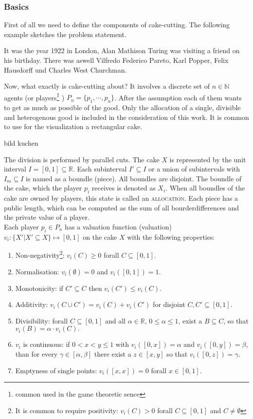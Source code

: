 \subsubsection{Basics}
First of all we need to define the components of cake-cutting. The following example sketches the problem statement.\\
\begin{bsp}
It was the year 1922 in London, Alan Mathison Turing was visiting a friend on his birthday. There was aswell Vilfredo Federico Pareto, Karl Popper, Felix Hausdorff und Charles West Churchman.
\end{bsp}
Now, what exactly is cake-cutting about? It involves a discrete set of $n \in \mathbb{N}$ agents (or players\footnote{common used in the game theoretic sence} ) $P_n=\{p_1,\cdots,p_n\}$. After the assumption each of them wants to get as much as possible of the good. Only the allocation of a single, divisible and heterogenous good is included in the consideration of this work. It is common to use for the visualization a rectangular cake.
\begin{center}
bild kuchen
\end{center}
The division is performed by parallel cuts. The cake $X$ is represented by the unit interval $I=[0,1] \subseteq \mathbb{R}$. Each subinterval $I'\subseteq I$ or a union of subintervals %
with $I_m\subseteq I$ is named as a boundle (piece). All boundles are disjoint. The boundle of the cake, which the player $p_i$ receives is denoted as $X_i$. When all boundles of the cake are owned by players, this state is called an \textsc{allocation}. Each piece has a public length, which can be computed as the sum of all bourderdifferences and the private value of a player.\\

Each player $p_i\in P_n$ has a valuation function (valuation) $v_i:\{X'|X' \subseteq X\} \mapsto [0,1]$ on the cake $X$ with the following properties:\\
\begin{enumerate}
\item Non-negativity\footnote{It is common to require positivity: $v_i(C)>0$ forall $C\subseteq [0,1]$ and $C \neq \emptyset$}: $v_i(C)\geq 0$ forall $C\subseteq [0,1].$
\item Normalisation: $v_i(\emptyset)=0$ and $v_i([0,1])=1.$
\item Monotonicity: if $C' \subseteq C$ then $v_i(C') \leq v_i(C).$
\item Additivity: $v_i(C \cup C')=v_i(C)+v_i(C')$ for disjoint
$C,C'\subseteq [0,1].$
\item Divisibility: forall $C\subseteq [0,1]$ and all $\alpha \in
\mathbb{R}$, $0\leq \alpha \leq 1$, exist a $B\subseteq C$, so that
$v_i(B)=\alpha \cdot v_i(C).$
\item  $v_i$ is continuous: if $0<x<y\leq 1$ with $v_i([0,x])=\alpha$ and
$v_i([0,y])=\beta$, than for every $\gamma \in [\alpha,\beta]$ there exist a $z \in [x,y]$ so that $v_i([0,z])=\gamma.$
\item Emptyness of single points:  $v_i([x,x])=0$ forall $x\in [0,1].$
\end{enumerate}

